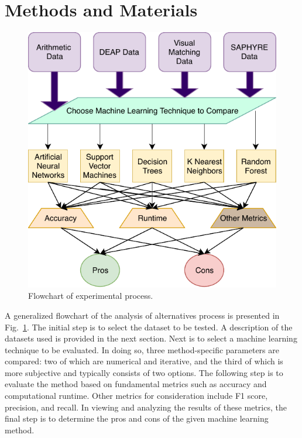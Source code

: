 \documentclass[12pt]{uthesis-v12}  %
\begin{document}
\section{Methods and Materials}
\label{dagsi-mm}

\begin{figure}[!t]
\centering
\includegraphics[width=5in]{exp-fig}
\caption{Flowchart of experimental process.}
\label{exp-fig}
\end{figure}

A generalized flowchart of the analysis of alternatives process is presented in Fig.~\ref{exp-fig}. The initial step is to select the dataset to be tested. A description of the datasets used is provided in the next section. Next is to select a machine learning technique to be evaluated. In doing so, three method-specific parameters are compared: two of which are numerical and iterative, and the third of which is more subjective and typically consists of two options. The following step is to evaluate the method based on fundamental metrics such as accuracy and computational runtime. Other metrics for consideration include F1 score, precision, and recall. In viewing and analyzing the results of these metrics, the final step is to determine the pros and cons of the given machine learning method.
\end{document}
